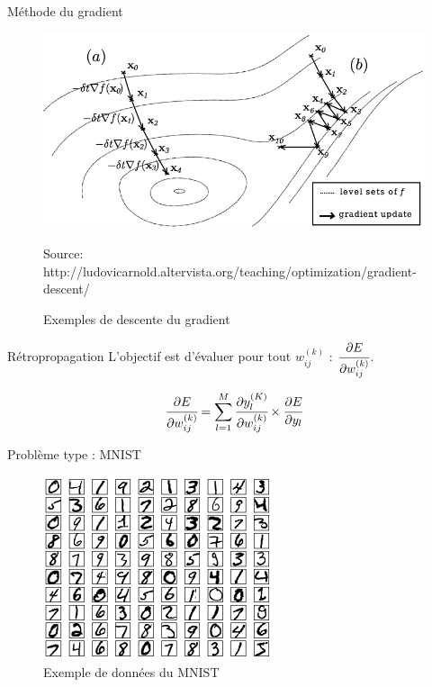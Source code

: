 \documentclass{beamer}
\begin{document}
\begin{frame}{Méthode du gradient}
  \begin{figure}
  \begin{center}
  \includegraphics[scale=0.45]{images/descente_gradient.png}
  \caption{Exemples de descente du gradient}
  {\tiny Source: http://ludovicarnold.altervista.org/teaching/optimization/gradient-descent/}
  \end{center}
  \end{figure}
\end{frame}

\begin{frame}{Rétropropagation}
  L'objectif est d'évaluer pour tout $w_{ij}^{(k)}$ :
   $\cfrac{\partial E}{\partial w_{ij}^{(k)}}$.

  \begin{align*}
  \cfrac{\partial E}{\partial w_{ij}^{(k)}} &= \sum_{l = 1}^{M} \cfrac{\partial y_l^{(K)}}{\partial w_{ij}^{(k)}} \times \cfrac{\partial E}{\partial y_l}\\
  \end{align*}

\end{frame}

\begin{frame}{Problème type : MNIST}
  \begin{figure}
  \begin{center}
  \includegraphics[scale=1.1]{images/mnist_data.png}
  \caption{Exemple de données du MNIST}
  \end{center}
  \end{figure}
\end{frame}
\end{document}
